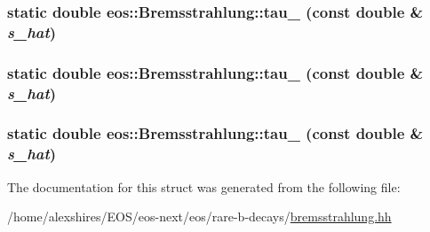 \label{structeos_1_1Bremsstrahlung_a51142a21972c592612539cf4bd35cafb}
\hypertarget{structeos_1_1Bremsstrahlung_a708d1b79eb63945e3598f1c8f8bc07dc}{
\subsubsection[{tau\_\-78}]{\setlength{\rightskip}{0pt plus 5cm}static double eos::Bremsstrahlung::tau\_ (const double \& {\em s\_\-hat})}}
\label{structeos_1_1Bremsstrahlung_a708d1b79eb63945e3598f1c8f8bc07dc}
\hypertarget{structeos_1_1Bremsstrahlung_af68817dd4b204589d133d149210a2365}{
\subsubsection[{tau\_\-88}]{\setlength{\rightskip}{0pt plus 5cm}static double eos::Bremsstrahlung::tau\_ (const double \& {\em s\_\-hat})}}
\label{structeos_1_1Bremsstrahlung_af68817dd4b204589d133d149210a2365}
\hypertarget{structeos_1_1Bremsstrahlung_aaec7f205ee9e02b804617fc8470d86d3}{
\subsubsection[{tau\_\-89}]{\setlength{\rightskip}{0pt plus 5cm}static double eos::Bremsstrahlung::tau\_ (const double \& {\em s\_\-hat})}}
\label{structeos_1_1Bremsstrahlung_aaec7f205ee9e02b804617fc8470d86d3}


The documentation for this struct was generated from the following file:\begin{DoxyCompactItemize}
\item 
/home/alexshires/EOS/eos-\/next/eos/rare-\/b-\/decays/\hyperlink{bremsstrahlung_8hh}{bremsstrahlung.hh}\end{DoxyCompactItemize}
